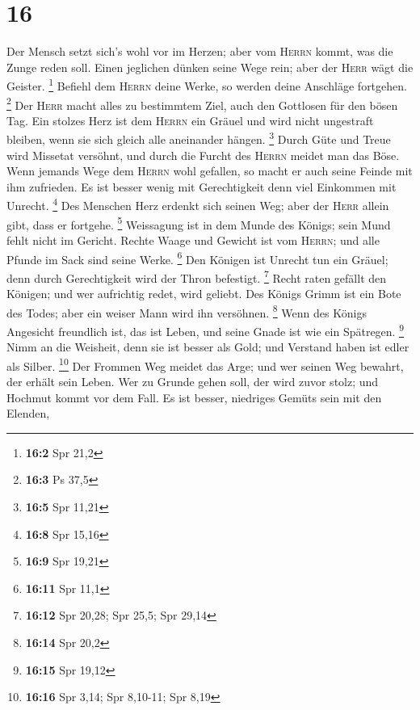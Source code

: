 \hypertarget{section-6}{%
\section{16}\label{section-6}}

 Der Mensch setzt sich's wohl vor im Herzen; aber vom
\textsc{Herrn} kommt, was die Zunge reden soll.  Einen
jeglichen dünken seine Wege rein; aber der \textsc{Herr} wägt die
Geister. \footnote{\textbf{16:2} Spr 21,2}  Befiehl dem
\textsc{Herrn} deine Werke, so werden deine Anschläge fortgehen.
\footnote{\textbf{16:3} Ps 37,5}  Der \textsc{Herr} macht
alles zu bestimmtem Ziel, auch den Gottlosen für den bösen Tag.
 Ein stolzes Herz ist dem \textsc{Herrn} ein Gräuel und
wird nicht ungestraft bleiben, wenn sie sich gleich alle aneinander
hängen. \footnote{\textbf{16:5} Spr 11,21}  Durch Güte und
Treue wird Missetat versöhnt, und durch die Furcht des \textsc{Herrn}
meidet man das Böse.  Wenn jemands Wege dem \textsc{Herrn}
wohl gefallen, so macht er auch seine Feinde mit ihm zufrieden.
 Es ist besser wenig mit Gerechtigkeit denn viel Einkommen
mit Unrecht. \footnote{\textbf{16:8} Spr 15,16}  Des
Menschen Herz erdenkt sich seinen Weg; aber der \textsc{Herr} allein
gibt, dass er fortgehe. \footnote{\textbf{16:9} Spr 19,21}
 Weissagung ist in dem Munde des Königs; sein Mund fehlt
nicht im Gericht.  Rechte Waage und Gewicht ist vom
\textsc{Herrn}; und alle Pfunde im Sack sind seine Werke. \footnote{\textbf{16:11}
  Spr 11,1}  Den Königen ist Unrecht tun ein Gräuel; denn
durch Gerechtigkeit wird der Thron befestigt. \footnote{\textbf{16:12}
  Spr 20,28; Spr 25,5; Spr 29,14}  Recht raten gefällt
den Königen; und wer aufrichtig redet, wird geliebt.  Des
Königs Grimm ist ein Bote des Todes; aber ein weiser Mann wird ihn
versöhnen. \footnote{\textbf{16:14} Spr 20,2}  Wenn des
Königs Angesicht freundlich ist, das ist Leben, und seine Gnade ist wie
ein Spätregen. \footnote{\textbf{16:15} Spr 19,12}  Nimm
an die Weisheit, denn sie ist besser als Gold; und Verstand haben ist
edler als Silber. \footnote{\textbf{16:16} Spr 3,14; Spr 8,10-11; Spr
  8,19}  Der Frommen Weg meidet das Arge; und wer seinen
Weg bewahrt, der erhält sein Leben.  Wer zu Grunde gehen
soll, der wird zuvor stolz; und Hochmut kommt vor dem Fall.
 Es ist besser, niedriges Gemüts sein mit den Elenden,
